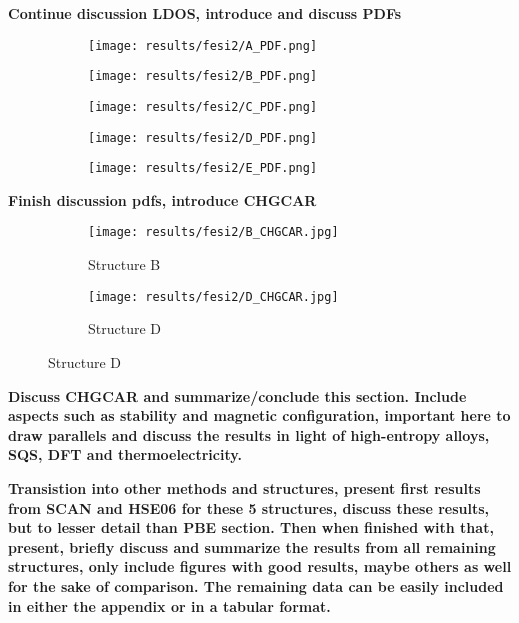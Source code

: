 \textbf{Continue discussion LDOS, introduce and discuss PDFs}

\begin{figure}[H]
	\begin{subfigure}{\textwidth}
		\texttt{[image: results/fesi2/A\_PDF.png]}
	\end{subfigure}	
	\begin{subfigure}{\textwidth}
		\texttt{[image: results/fesi2/B\_PDF.png]}
	\end{subfigure}
	\begin{subfigure}{\textwidth}
		\texttt{[image: results/fesi2/C\_PDF.png]}
	\end{subfigure}
\end{figure}
\begin{figure}[H]
	\begin{subfigure}{\textwidth}
		\texttt{[image: results/fesi2/D\_PDF.png]}
	\end{subfigure}
	\begin{subfigure}{\textwidth}
		\texttt{[image: results/fesi2/E\_PDF.png]}
	\end{subfigure}
\end{figure}

\textbf{Finish discussion pdfs, introduce CHGCAR}

\begin{figure}
	\begin{subfigure}{\textwidth}
		\texttt{[image: results/fesi2/B\_CHGCAR.jpg]}
		\caption{Structure B}
	\end{subfigure}
	\hfill
	\begin{subfigure}{\textwidth}
		\texttt{[image: results/fesi2/D\_CHGCAR.jpg]}
		\caption{Structure D}
	\end{subfigure}
\end{figure}



\textbf{Discuss CHGCAR and summarize/conclude this section. Include aspects such as stability and magnetic configuration, important here to draw parallels and discuss the results in light of high-entropy alloys, SQS, DFT and thermoelectricity. }

\textbf{Transistion into other methods and structures, present first results from SCAN and HSE06 for these 5 structures, discuss these results, but to lesser detail than PBE section. Then when finished with that, present, briefly discuss and summarize the results from all remaining structures, only include figures with good results, maybe others as well for the sake of comparison. The remaining data can be easily included in either the appendix or in a tabular format. }

